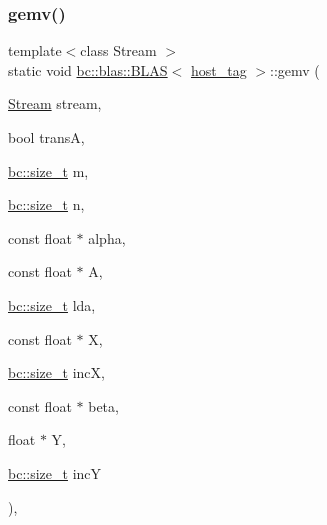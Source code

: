 \subsubsection{\texorpdfstring{gemv()}{gemv()}\hspace{0.1cm}{\footnotesize\ttfamily [2/2]}}
{\footnotesize\ttfamily template$<$class Stream $>$ \\
static void \hyperlink{structbc_1_1blas_1_1BLAS}{bc\+::blas\+::\+B\+L\+AS}$<$ \hyperlink{structbc_1_1host__tag}{host\+\_\+tag} $>$\+::gemv (\begin{DoxyParamCaption}\item[{\hyperlink{classbc_1_1streams_1_1Stream}{Stream}}]{stream,  }\item[{bool}]{transA,  }\item[{\hyperlink{namespacebc_aaf8e3fbf99b04b1b57c4f80c6f55d3c5}{bc\+::size\+\_\+t}}]{m,  }\item[{\hyperlink{namespacebc_aaf8e3fbf99b04b1b57c4f80c6f55d3c5}{bc\+::size\+\_\+t}}]{n,  }\item[{const float $\ast$}]{alpha,  }\item[{const float $\ast$}]{A,  }\item[{\hyperlink{namespacebc_aaf8e3fbf99b04b1b57c4f80c6f55d3c5}{bc\+::size\+\_\+t}}]{lda,  }\item[{const float $\ast$}]{X,  }\item[{\hyperlink{namespacebc_aaf8e3fbf99b04b1b57c4f80c6f55d3c5}{bc\+::size\+\_\+t}}]{incX,  }\item[{const float $\ast$}]{beta,  }\item[{float $\ast$}]{Y,  }\item[{\hyperlink{namespacebc_aaf8e3fbf99b04b1b57c4f80c6f55d3c5}{bc\+::size\+\_\+t}}]{incY }\end{DoxyParamCaption})\hspace{0.3cm}{\ttfamily [inline]}, {\ttfamily [static]}}

\mbox{\label{structbc_1_1blas_1_1BLAS_3_01host__tag_01_4_a19490f63f183da7d30a2e6bf5cf03a5e}} 
